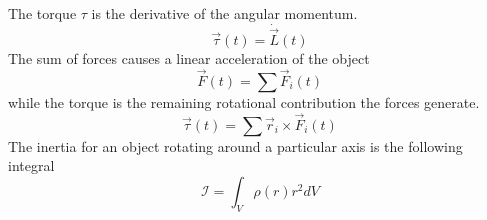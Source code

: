 \documentclass[12pt,a4paper,twoside]{article}
\begin{document}
The torque $\tau$ is the derivative of the angular momentum.
\begin{equation*}
  \vec{\tau}(t) = \dot{\vec{L}}(t)
\end{equation*}
The sum of forces causes a linear acceleration of the object
\begin{equation*}
  \vec{F}(t) = \sum \vec{F}_i(t)
\end{equation*}
while the torque is the remaining rotational contribution the forces generate.
\begin{equation*}
  \vec{\tau}(t) = \sum \vec{r}_i \times \vec{F}_i(t)
\end{equation*}
The inertia for an object rotating around a particular axis is the following integral
\begin{equation*}
  \mathcal{I}=\int_V\rho(r)r^2dV
\end{equation*}
\end{document}
